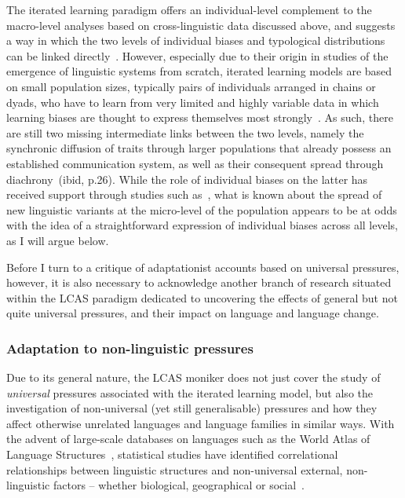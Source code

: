 The iterated learning paradigm offers an individual-level complement to the macro-level analyses based on cross-linguistic data discussed above, and suggests a way in which the two levels of individual biases and typological distributions can be linked directly~\citep{Kirby1999,Kirby2008}. However, especially due to their origin in studies of the emergence of linguistic systems from scratch, iterated learning models are based on small population sizes, typically pairs of individuals arranged in chains or dyads, who have to learn from very limited and highly variable data in which learning biases are thought to express themselves most strongly~\citep{Fedzechkina2014}. As such, there are still two missing intermediate links between the two levels, namely the synchronic diffusion of traits through larger populations that already possess an established communication system, as well as their consequent spread through diachrony~(ibid, p.26). While the role of individual biases on the latter has received support through studies such as~\citet{Wedel2013short}, what is known about the spread of new linguistic variants at the micro-level of the population appears to be at odds with the idea of a straightforward expression of individual biases across all levels, as I will argue below.

Before I turn to a critique of adaptationist accounts based on universal pressures, however, it is also necessary to acknowledge another branch of research situated within the LCAS paradigm dedicated to uncovering the effects of general but not quite universal pressures, and their impact on language and language change.



\subsubsection{Adaptation to non-linguistic pressures}

Due to its general nature, the LCAS moniker does not just cover the study of \emph{universal} pressures associated with the iterated learning model, but also the investigation of non-universal (yet still generalisable) pressures and how they affect otherwise unrelated languages and language families in similar ways.
With the advent of large-scale databases on languages such as the World Atlas of Language Structures~\citep[WALS][]{WALS2013}, statistical studies have identified correlational relationships between linguistic structures and non-universal external, non-linguistic factors -- whether biological, geographical or social~\citep{Ladd2015}.

